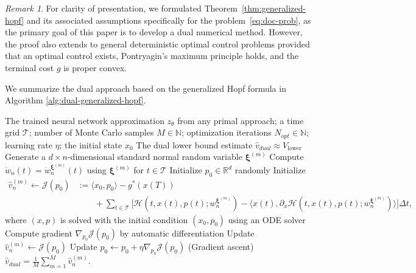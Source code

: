 \documentclass[11pt]{article}
\numberwithin{equation}{section}
\theoremstyle{plain}
\theoremstyle{definition}
\theoremstyle{remark}
\newtheorem{remark}[theorem]{Remark}
\begin{document}
\begin{remark}
For clarity of presentation, we formulated Theorem~\ref{thm:generalized-hopf} and its associated assumptions specifically for the problem~\eqref{eq:doc-prob}, as the primary goal of this paper is to develop a dual numerical method. However, the proof also extends to general deterministic optimal control problems provided that an optimal control exists, Pontryagin’s maximum principle holds, and the terminal cost $g$ is proper convex. 
\end{remark}

We summarize the dual approach based on the generalized Hopf formula in Algorithm \ref{alg:dual-generalized-hopf}. 

\begin{algorithm}[htbp!]
\caption{Computing the dual lower bound using the generalized Hopf formula}
\label{alg:dual-generalized-hopf}
\begin{algorithmic}[1]
\REQUIRE The trained neural network approximation $z_\theta$ from any primal approach; a time grid $\mathcal{T}$; number of Monte Carlo samples $M\in \mathbb{N}$; optimization iterations $N_{opt}\in \mathbb{N}$; learning rate $\eta$; the initial state $x_0$ 
\ENSURE The dual lower bound estimate $\hat{v}_{dual} \approx V_{\text{lower}}$ 
    \STATE Generate a $d\times n$-dimensional standard normal random variable $\bm{\xi}^{(m)}$ 
    \STATE Compute $\dot{w}_n(t) = \dot{w}_n^{\bm{\xi}^{(m)}}(t)$ using $\bm{\xi}^{(m)}$ for $t\in \mathcal{T}$ 
        \STATE Initialize $p_0 \in \mathbb{R}^d$ randomly 
        \STATE Initialize  
        \begin{align*}
            \hat{v}_n^{(m)} \leftarrow \mathcal{J}(p_0) &:= \langle x_0, p_0\rangle - g^*(x(T)) 
            \\
            &\qquad + \sum_{t\in \mathcal{T}} \bigg[\mathcal{H}(t, x(t), p(t); w_n^{\bm{\xi}^{(m)}}) - \langle x(t), \partial_x\mathcal{H}(t, x(t), p(t); w_n^{\bm{\xi}^{(m)}})\rangle \bigg]\Delta t,
        \end{align*}
        where $(x, p)$ is solved with the initial condition $(x_0, p_0)$ using an ODE solver 
            \STATE Compute gradient $\nabla_{p_0}\mathcal{J}(p_0)$ by automatic differentiation 
            \STATE Update $\hat{v}_n^{(m)} \leftarrow \mathcal{J}(p_0)$ 
            \STATE Update $p_0 \leftarrow p_0 +\eta \nabla_{p_0}\mathcal{J}(p_0)$  (Gradient ascent)
        \ENDFOR
\ENDFOR
\RETURN $\hat{v}_{dual} = \frac{1}{M}\sum_{m=1}^M \hat{v}_n^{(m)}$. 
\end{algorithmic}
\end{algorithm}
\end{document}
